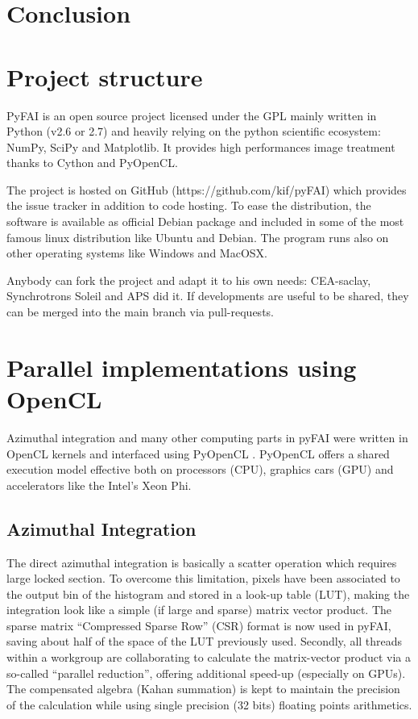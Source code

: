 \documentclass[preprint]{iucr}
\begin{document}
\section{Conclusion}






\appendix
\section{Project structure}
PyFAI is an open source project licensed under the GPL mainly written in Python (v2.6 or 2.7)
and heavily relying on the python scientific ecosystem: NumPy, SciPy and Matplotlib.
It provides high performances image treatment thanks to Cython and PyOpenCL.

The project is hosted on GitHub (https://github.com/kif/pyFAI) which provides
the issue tracker in addition to code hosting.
To ease the distribution, the
software is available as official Debian package and included in some of the
most famous linux distribution like Ubuntu and Debian.
The program runs also on other operating systems like Windows and MacOSX.

Anybody can fork the project and adapt it to his own needs: CEA-saclay,
Synchrotrons Soleil and APS did it. If developments are useful to be shared,
they can be merged into the main branch via pull-requests.

\section{Parallel implementations using OpenCL}
Azimuthal integration and many other computing parts in pyFAI were written in
OpenCL kernels and interfaced using PyOpenCL \cite{pyopencl}. PyOpenCL offers a
shared execution model effective both on processors (CPU), graphics cars (GPU)
and accelerators like the Intel's Xeon Phi.

\subsection{Azimuthal Integration}
The direct azimuthal integration is basically a scatter operation which
requires large locked section.
To overcome this limitation, pixels have been
associated to the output bin of the histogram and stored in a look-up
table (LUT), making the integration look like a simple (if large and sparse)
matrix vector product.
The sparse matrix ``Compressed Sparse Row'' (CSR) format is now used in pyFAI,
saving about half of the space of the LUT previously used.
Secondly, all threads within a workgroup are collaborating to calculate the
matrix-vector product via a so-called ``parallel reduction'', offering
additional speed-up (especially on GPUs).
The compensated algebra (Kahan summation) is kept to maintain the precision
of the calculation while using single precision (32 bits) floating points
arithmetics.
\end{document}

